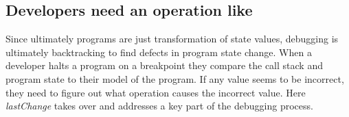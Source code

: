 \documentclass{sig-alternate}
\begin{document}

\subsection{Developers need an operation like  }


Since ultimately programs are just
transformation of state values, debugging is ultimately backtracking
to find defects in program state change\cite{Weiser,Zeller}.  When a developer halts a
program on a breakpoint they compare the call stack and program state to their model of the program.
If any value seems to be incorrect,  they need to figure out what operation
causes the incorrect value. Here \textit{lastChange} takes over and addresses a key
part of the debugging process.
\end{document}
